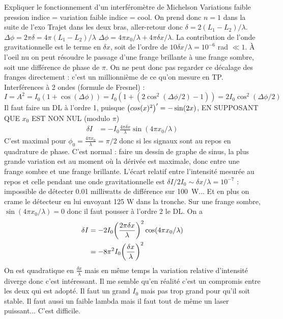 \begin{solution}

\begin{questions}
    \questioncours Expliquer le fonctionnement d'un interféromètre de Michelson
    \question Variations faible pression indice = variation faible indice = cool. On prend donc $n=1$ dans la suite de l'exo   
    \question Trajet dans les deux bras, aller-retour donc $\delta = 2(L_1-L_2)/\lambda$. $\Delta \phi = 2\pi \delta = 4\pi(L_1-L_2)/\lambda$
    \question $\Delta \phi = 4\pi x_0 /\lambda + 4\pi \delta x/\lambda$. La contribution de l'onde gravitationnelle est le terme en $\delta x$, soit de l'ordre de $10\delta x/\lambda = 10^{-6}$ rad $\ll 1$. À l'oeil nu on peut résoudre le passage d'une frange brillante à une frange sombre, soit une différence de phase de $\pi$. On ne peut donc pas regarder ce décalage des franges directement : c'est un millionnième de ce qu'on mesure en TP.
    \question Interférences à 2 ondes (formule de Fresnel) : $I = A^2= I_0(1+\cos(\Delta \phi)) = I_0(1+ (2\cos^2(\Delta\phi/2)- 1)) = 2I_0\cos^2(\Delta\phi/2)$
    \question Il faut faire un DL à l'ordre 1, puisque $\qty(cos(x)^2)'= -\sin (2x)$, EN SUPPOSANT QUE $x_0$ EST NON NUL (modulo $\pi$)
    \begin{align*}
    \delta I &= -I_0\frac{4\pi \delta x}{\lambda}\sin(4\pi x_0 /\lambda)
    \end{align*}
    \question C'est maximal pour $\phi_0 = \frac{4\pi x_0}{\lambda} = \pi/2$ donc si les signaux sont au repos en quadrature de phase. C'est normal : faire un dessin de graphe de sinus, la plus grande variation est au moment où la dérivée est maximale, donc entre une frange sombre et une frange brillante.
    \question L'écart relatif entre l'intensité mesurée au repos et celle pendant une onde gravitationnelle est $\delta I/2I_0 \sim \delta x/\lambda = 10^{-7}$ : impossible de détecter 0.01 milliwatts de différence sur 100~W... Et en plus on crame le détecteur en lui envoyant 125 W dans la tronche.
    \question Sur une frange sombre, $\sin(4\pi x_0 /\lambda) = 0$ donc il faut pousser à l'ordre 2 le DL. On a
    \begin{align*}
    \delta I &=  -2I_0 \qty(\frac{2\pi \delta x}{\lambda})^2\cos(4\pi x_0 /\lambda) \\
    &=  - 8\pi^2 I_0 \qty(\frac{ \delta x}{\lambda})^2
    \end{align*}
    On est quadratique en $\frac{ \delta x}{\lambda}$ mais en même temps la variation relative d'intensité diverge donc c'est intéressant. Il me semble qu'en réalité c'est un compromis entre les deux qui est adopté.
    \question  Il faut un grand $I_0$ mais pas trop grand pour qu'il soit stable. Il faut aussi un faible lambda mais il faut tout de même un laser puissant... C'est difficile.
    
\end{questions}
\end{solution}